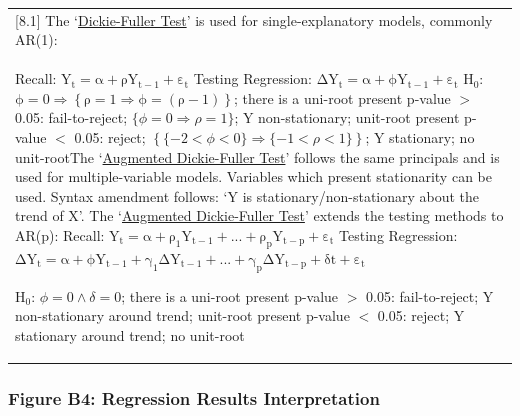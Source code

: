 \documentclass[11pt, english]{article}
\begin{document}
\begin{center}
\begin{longtable}{p{14cm}}
			[8.1] The `\underline{Dickie-Fuller Test}' is used for single-explanatory models, commonly AR(1):\\
			Recall: $\mathrm{Y_t=\alpha+\rho Y_{t-1}+\varepsilon_t}$\newline
			Testing Regression: $\mathrm{\Delta Y_t=\alpha+\phi Y_{t-1}+\varepsilon_t}$\newline\newline
			H$_0$: $\mathrm{\phi=0\Rightarrow\left\{\rho=1\Rightarrow\phi=(\rho-1)\right\}}$; there is a uni-root present\newline\newline
			p-value $>$ 0.05: fail-to-reject; $\{\phi=0\Rightarrow\rho=1\}$; Y non-stationary; unit-root present\newline
			p-value $<$ 0.05: reject; $\left\{\{-2<\phi<0\}\Rightarrow\{-1<\rho<1\}\right\}$; Y stationary; no unit-root\newline\newline
			[8.2] The `\underline{Augmented Dickie-Fuller Test}' follows the same principals and is used for multiple-variable models. Variables which present stationarity can be used. Syntax amendment follows: `Y is stationary/non-stationary about the trend of X’. The `\underline{Augmented Dickie-Fuller Test}' extends the testing methods to AR(p):\newline\newline
			Recall: $\mathrm{Y_t=\alpha+\rho_1Y_{t-1}+...+\rho_pY_{t-p}+\varepsilon_t}$\newline
			Testing Regression: $\mathrm{\Delta Y_t=\alpha+\phi Y_{t-1}+\gamma_1\Delta Y_{t-1}+...+\gamma_p\Delta Y_{t-p}+\delta t+\varepsilon_t}$\newline

			H$_0$: $\phi=0\land\delta=0$; there is a uni-root present\newline\newline
			p-value $>$ 0.05: fail-to-reject; Y non-stationary around trend; unit-root present\newline
			p-value $<$ 0.05: reject; Y stationary around trend; no unit-root\\
			\hline
		\end{longtable}	
		\end{center}

		\newpage

		\subsubsection*{Figure B4: Regression Results Interpretation}
\end{document}
